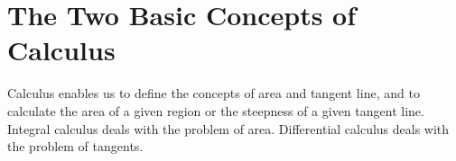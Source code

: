\section{The Two Basic Concepts of Calculus}\label{sec:1.1.1}

\begin{note}
  Calculus enables us to define the concepts of area and tangent line, and to calculate the area of a given region or the steepness of a given tangent line.
  Integral calculus deals with the problem of area.
  Differential calculus deals with the problem of tangents.
\end{note}
